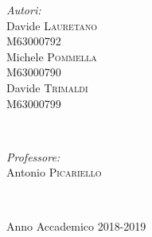 \documentclass[a4paper,12pt]{report}
\begin{document}
\begin{titlepage}
		
		\vspace{-1.5cm}
		\begin{minipage}{0.4\textwidth}
			\begin{flushleft} \large
				\emph{Autori:}\\
				Davide  \textsc{Lauretano \\}\textsc{M63000792}\\ Michele  \textsc{Pommella} \\ \textsc{M63000790}\\Davide  \textsc{Trimaldi \\}\textsc{M63000799}
			\end{flushleft}
		\end{minipage}
		~
		\begin{minipage}{0.4\textwidth}
			\begin{flushright} \large
				\emph{Professore:} \\
				Antonio  \textsc{Picariello \\}
			\end{flushright}
		\end{minipage}\\
		\begin{center}
			\vfill
			{\sc Anno Accademico 2018-2019}
		\end{center}
	\end{titlepage}
	
	
	
	\tableofcontents
	\listoffigures
	\lstlistoflistings
	\listofalgorithms
	
	
	
	
	
	
\end{document}
